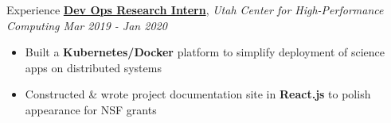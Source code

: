 \documentclass{resume/resume}
\begin{document}
\begin{rSection}{Experience}
    \href{https://slateci.io/}{\bf Dev Ops Research Intern}, {\em Utah Center for High-Performance Computing \hfill Mar 2019 - Jan 2020}
    \vspace{-6pt}
    \begin{itemize}[nosep]
        \item Built a {\bf Kubernetes/Docker} platform to simplify deployment of science apps on distributed systems
        \item Constructed \& wrote project documentation site in {\bf React.js} to polish appearance for NSF grants
    \end{itemize}
    
    


\end{rSection}
\end{document}
